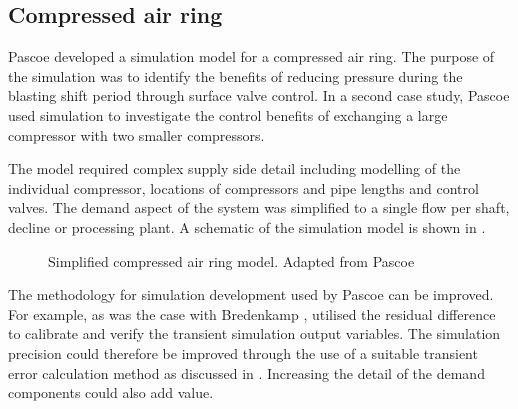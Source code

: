 \subsection{Compressed air ring}
Pascoe \cite{Pascoe2016Masters} developed a simulation model for a compressed air ring. The purpose of the simulation was to identify the benefits of reducing pressure during the blasting shift period through surface valve control. In a second case study, Pascoe used simulation to investigate the control benefits of exchanging a large compressor with two smaller compressors.
\par 
 The model required complex supply side detail including modelling of the individual compressor, locations of compressors and pipe lengths and control valves. The demand aspect of the system was simplified to a single flow per shaft, decline or processing plant. A schematic of the simulation model is shown in .
 \par
\begin{figure}[!htbp]
	\centering
	\caption[Simplified compressed air ring model]{Simplified compressed air ring model. Adapted from Pascoe \cite{Pascoe2016Masters}}
	\label{fig:Pascoe model}
\end{figure}
The methodology for simulation development used by Pascoe can be improved. For example, as was the case with Bredenkamp \cite{Bredenkamp2013Masters}, \cite{Pascoe2016Masters} utilised the residual difference to calibrate and verify the transient simulation output variables. The simulation precision could therefore be improved through the use of a suitable transient error calculation method as discussed in . Increasing the detail of the demand components could also add value.

